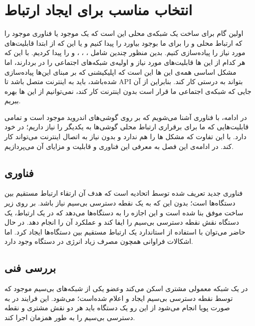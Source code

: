 \chapter{انتخاب مناسب برای ایجاد ارتباط }
\thispagestyle{empty}

اولین گام برای ساخت یک شبکه‌ی محلی این است که یک 
موجود یا فناوری موجود را که ارتباط محلی و 
را برای ما بوجود بیاورد را پیدا کنیم و یا این که از ابتدا قابلیت‌های مورد نیاز را پیاده‌سازی کنیم. بدین منظور چندین 
شامل
\cite{p2pkit}
،
\cite{Alljoyn}
،
\cite{Nearby}
،
\cite{Hypelabs}
و
\cite{OpenGarden} 
را پیدا کردیم.
با این که هر کدام از این 
ها قابلیت‌های مورد نیاز و اولیه‌ی شبکه‌های اجتماعی را در بردارند، اما مشکل اساسی همه‌ی این 
ها این است که اپلیکیشنی که بر مبنای این‌ها پیاده‌سازی شده‌باشد، باید به اینترنت متصل باشد تا API بتواند به درستی کار کند. بنابراین از آن جایی که شبکه‌ی اجتماعی ما قرار است بدون اینترنت کار کند، نمی‌توانیم از این 
ها بهره ببریم.

در ادامه، با فناوری
 آشنا می‌شویم که بر روی گوشی‌های اندروید موجود است و تمامی قابلیت‌هایی که ما برای برقراری ارتباط محلی گوشی‌ها به یکدیگر را نیاز داریم؛ در خود دارد. با این تفاوت که مشکل 
ها را هم ندارد و بدون نیاز به اتصال اینترنت می‌تواند کار کند. در ادامه‌ی این فصل به معرفی این فناوری و قابلیت و مزایای آن می‌پردازیم.

\section{فناوری } 
 فناوری جدید تعریف شده توسط اتحادیه 
  است که هدف آن ارتقاء ارتباط مستقیم بین دستگاه‌ها است؛ بدون این که به یک نقطه دسترسی بی‌سیم
   نیاز باشد.
بر روی زیر ساخت موفق 
بنا شده است و این اجازه را به دستگاه‌ها می‌دهد که در یک ارتباط، یک دستگاه نقش  نقطه دسترسی بی‌سیم را ایفا کند و عملکرد آن را انجام دهد. در حال حاضر می‌توان با استفاده از استاندارد 
یک ارتباط مستقیم بین دستگاه‌ها ایجاد کرد. اما اشکالات فراوانی همچون مصرف زیاد انرژی در دستگاه وجود دارد.
\cite{WiFiAlliance}
 
\section{بررسی فنی}
 در یک شبکه معمولی 
مشتری
 اسکن می‌کند وعضو یکی از شبکه‌های بی‌سیم موجود که توسط نقطه دسترسی بی‌سیم ایجاد و اعلام شده‌است؛ می‌شود. این فرایند در 
به صورت پویا
انجام می‌شود از این رو یک دستگاه 
باید هر دو نقش مشتری و نقطه دسترسی بی‌سیم را به طور همزمان اجرا کند.
\cite{WiFiAlliance}

